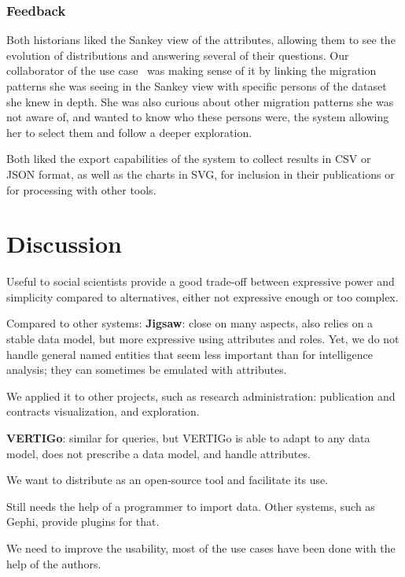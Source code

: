 \subsubsection{Feedback}

Both historians liked the Sankey view of the attributes, allowing them to see the evolution of distributions and answering several of their questions. Our collaborator of the use case \nicole\ was making sense of it by linking the migration patterns she was seeing in the Sankey view with specific persons of the dataset she knew in depth. She was also curious about other migration patterns she was not aware of, and wanted to know who these persons were, the system allowing her to select them and follow a deeper exploration.

Both liked the export capabilities of the system to collect results in CSV or JSON format, as well as the charts in SVG, for inclusion in their publications or for processing with other tools.





\iffalse
\section{Discussion}

Useful to social scientists provide a good trade-off between expressive power and simplicity compared to alternatives, either not expressive enough or too complex.

Compared to other systems:
\textbf{Jigsaw}: close on many aspects, also relies on a stable data model, but more expressive using attributes and roles. Yet, we do not handle general named entities that seem less important than for intelligence analysis; they can sometimes be emulated with attributes.

We applied it to other projects, such as research administration: publication and contracts visualization, and exploration.


\textbf{VERTIGo}: similar for queries, but VERTIGo is able to adapt to any data model, does not prescribe a data model, and handle attributes.

We want to distribute \name as an open-source tool and facilitate its use.

Still needs the help of a programmer to import data. Other systems, such as Gephi, provide plugins for that.

 We need to improve the usability, most of the use cases have been done with the help of the authors.


